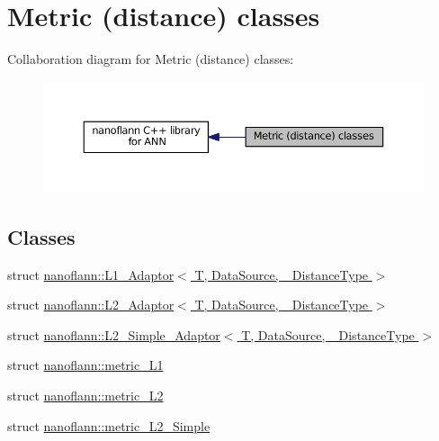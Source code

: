 \hypertarget{group__metric__grp}{\section{Metric (distance) classes}
\label{group__metric__grp}
}
Collaboration diagram for Metric (distance) classes\-:\nopagebreak
\begin{figure}[H]
\begin{center}
\leavevmode
\includegraphics[width=350pt]{group__metric__grp}
\end{center}
\end{figure}
\subsection*{Classes}
\begin{DoxyCompactItemize}
\item 
struct \hyperlink{structnanoflann_1_1_l1___adaptor}{nanoflann\-::\-L1\-\_\-\-Adaptor$<$ T, Data\-Source, \-\_\-\-Distance\-Type $>$}
\item 
struct \hyperlink{structnanoflann_1_1_l2___adaptor}{nanoflann\-::\-L2\-\_\-\-Adaptor$<$ T, Data\-Source, \-\_\-\-Distance\-Type $>$}
\item 
struct \hyperlink{structnanoflann_1_1_l2___simple___adaptor}{nanoflann\-::\-L2\-\_\-\-Simple\-\_\-\-Adaptor$<$ T, Data\-Source, \-\_\-\-Distance\-Type $>$}
\item 
struct \hyperlink{structnanoflann_1_1metric___l1}{nanoflann\-::metric\-\_\-\-L1}
\item 
struct \hyperlink{structnanoflann_1_1metric___l2}{nanoflann\-::metric\-\_\-\-L2}
\item 
struct \hyperlink{structnanoflann_1_1metric___l2___simple}{nanoflann\-::metric\-\_\-\-L2\-\_\-\-Simple}
\end{DoxyCompactItemize}
